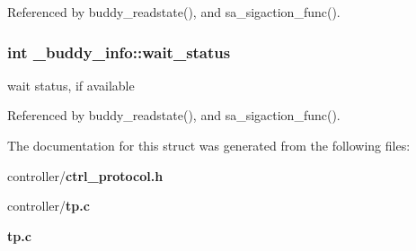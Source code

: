 Referenced by buddy\_\-readstate(), and sa\_\-sigaction\_\-func().

\subsubsection[{wait\_\-status}]{\setlength{\rightskip}{0pt plus 5cm}int {\bf \_\-buddy\_\-info::wait\_\-status}}\label{struct__buddy__info_a60504b45dc317e3607852855a74f6904}
wait status, if available 

Referenced by buddy\_\-readstate(), and sa\_\-sigaction\_\-func().



The documentation for this struct was generated from the following files:\begin{DoxyCompactItemize}
\item 
controller/{\bf ctrl\_\-protocol.h}\item 
controller/{\bf tp.c}\item 
{\bf tp.c}\end{DoxyCompactItemize}
